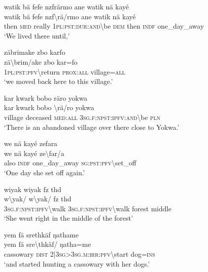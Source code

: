 \ea\label{ex:14:a3034}
watik bä fefe nzfrärmo ane watik nä kayé\\
\gll watik	bä	fefe	nzf{\textbackslash}rä/rmo	ane	watik	nä	kayé\\
     then	\textsc{med}	really	1\textsc{pl}:\textsc{pst}:\textsc{dur}:\textsc{and}{\textbackslash}be	\textsc{dem}	then	\textsc{indf}	one\_day\_away\\
\glt `We lived there until,'
\z

\ea\label{ex:14:a3035}
zäbrimake zbo karfo\\
\gll zä{\textbackslash}brim/ake	zbo	kar=fo\\
     1\textsc{pl}:\textsc{pst}:\textsc{pfv}{\textbackslash}return	\textsc{prox}:\textsc{all}	village=\textsc{all}\\
\glt `we moved back here to this village.'
\z

\ea\label{ex:14:a3037}
kar kwark bobo räro yokwa\\
\gll kar	kwark	bobo	{\textbackslash}rä/ro	yokwa\\
     village	deceased	\textsc{med}:\textsc{all}	3\textsc{sg}.\textsc{f}:\textsc{npst}:\textsc{ipfv}:\textsc{and}{\textbackslash}be	\textsc{pln}\\
\glt `There is an abandoned village over there close to Yokwa.'
\z

\ea\label{ex:14:a3039}
we nä kayé zefara\\
\gll we	nä	kayé	ze{\textbackslash}far/a\\
     also	\textsc{indf}	one\_day\_away	\textsc{sg}:\textsc{pst}:\textsc{pfv}{\textbackslash}set\_off\\
\glt `One day she set off again.'
\z

\ea\label{ex:14:a3040}
wiyak wiyak fz thd\\
\gll w{\textbackslash}yak/	w{\textbackslash}yak/	fz	thd\\
     3\textsc{sg}.\textsc{f}:\textsc{npst}:\textsc{ipfv}{\textbackslash}walk	3\textsc{sg}.\textsc{f}:\textsc{npst}:\textsc{ipfv}{\textbackslash}walk	forest	middle\\
\glt `She went right in the middle of the forest'
\z

\ea\label{ex:14:a3041}
yem fä srethkäf ŋathame\\
\gll yem	fä	sre{\textbackslash}thkäf/	ŋatha=me\\
     cassowary	\textsc{dist}	2|3\textsc{sg}>3\textsc{sg}.\textsc{m}:\textsc{irr}:\textsc{pfv}{\textbackslash}start	dog=\textsc{ins}\\
\glt `and started hunting a cassowary with her dogs.'
\z

